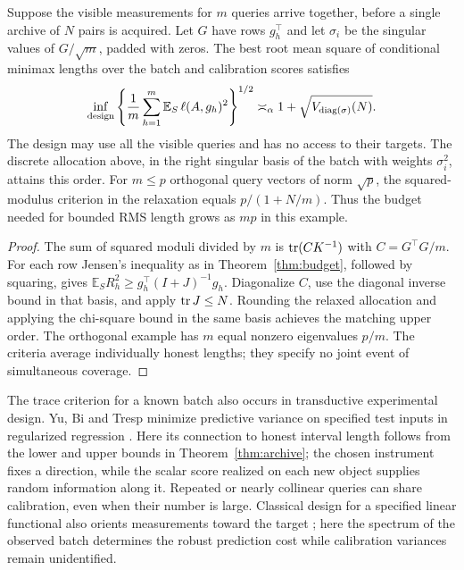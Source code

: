 \begin{corollary}\label{cor:batch}
Suppose the visible measurements for $m$ queries arrive together, before a single archive of $N$ pairs is acquired. Let $G$ have rows $g_h^\top$ and let $\sigma_i$ be the singular values of $G/\sqrt m$, padded with zeros. The best root mean square of conditional minimax lengths over the batch and calibration scores satisfies
\[
 \inf_{\rm design}\left\{\frac1m\sum_{h=1}^m
 \mathbb E_S\,\ell(A,g_h)^2\right\}^{1/2}
 \asymp_\alpha 1+\sqrt{V_{\operatorname{diag}(\sigma)}(N)} .
\]
The design may use all the visible queries and has no access to their targets. The discrete allocation above, in the right singular basis of the batch with weights $\sigma_i^2$, attains this order. For $m\le p$ orthogonal query vectors of norm $\sqrt p$, the squared-modulus criterion in the relaxation equals $p/(1+N/m)$. Thus the budget needed for bounded RMS length grows as $mp$ in this example.
\end{corollary}
\begin{proof}
The sum of squared moduli divided by $m$ is $\operatorname{tr}(C K^{-1})$ with $C=G^\top G/m$. For each row Jensen's inequality as in Theorem~\ref{thm:budget}, followed by squaring, gives $\mathbb E_S R_h^2\ge g_h^\top(I+J)^{-1}g_h$. Diagonalize $C$, use the diagonal inverse bound in that basis, and apply $\operatorname{tr} J\le N$. Rounding the relaxed allocation and applying the chi-square bound in the same basis achieves the matching upper order. The orthogonal example has $m$ equal nonzero eigenvalues $p/m$. The criteria average individually honest lengths; they specify no joint event of simultaneous coverage.
\end{proof}
The trace criterion for a known batch also occurs in transductive experimental design. Yu, Bi and Tresp minimize predictive variance on specified test inputs in regularized regression \cite{transductive}. Here its connection to honest interval length follows from the lower and upper bounds in Theorem~\ref{thm:archive}; the chosen instrument fixes a direction, while the scalar score realized on each new object supplies random information along it. Repeated or nearly collinear queries can share calibration, even when their number is large. Classical design for a specified linear functional also orients measurements toward the target \cite{elfving}; here the spectrum of the observed batch determines the robust prediction cost while calibration variances remain unidentified.
